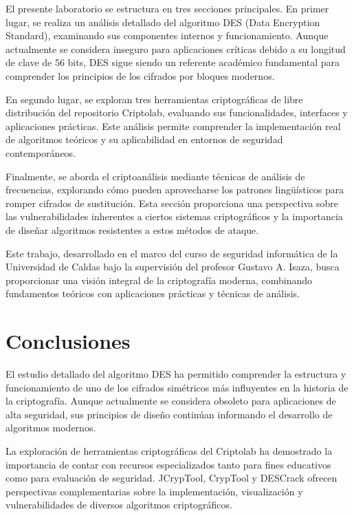 \documentclass[12pt,a4paper]{article}
\begin{document}
El presente laboratorio se estructura en tres secciones principales. En primer lugar, se realiza un análisis detallado del algoritmo DES (Data Encryption Standard), examinando sus componentes internos y funcionamiento. Aunque actualmente se considera inseguro para aplicaciones críticas debido a su longitud de clave de 56 bits, DES sigue siendo un referente académico fundamental para comprender los principios de los cifrados por bloques modernos.

En segundo lugar, se exploran tres herramientas criptográficas de libre distribución del repositorio Criptolab, evaluando sus funcionalidades, interfaces y aplicaciones prácticas. Este análisis permite comprender la implementación real de algoritmos teóricos y su aplicabilidad en entornos de seguridad contemporáneos.

Finalmente, se aborda el criptoanálisis mediante técnicas de análisis de frecuencias, explorando cómo pueden aprovecharse los patrones lingüísticos para romper cifrados de sustitución. Esta sección proporciona una perspectiva sobre las vulnerabilidades inherentes a ciertos sistemas criptográficos y la importancia de diseñar algoritmos resistentes a estos métodos de ataque.

Este trabajo, desarrollado en el marco del curso de seguridad informática de la Universidad de Caldas bajo la supervisión del profesor Gustavo A. Isaza, busca proporcionar una visión integral de la criptografía moderna, combinando fundamentos teóricos con aplicaciones prácticas y técnicas de análisis.














\section{Conclusiones}

El estudio detallado del algoritmo DES ha permitido comprender la estructura y funcionamiento de uno de los cifrados simétricos más influyentes en la historia de la criptografía. Aunque actualmente se considera obsoleto para aplicaciones de alta seguridad, sus principios de diseño continúan informando el desarrollo de algoritmos modernos.

La exploración de herramientas criptográficas del Criptolab ha demostrado la importancia de contar con recursos especializados tanto para fines educativos como para evaluación de seguridad. JCrypTool, CrypTool y DESCrack ofrecen perspectivas complementarias sobre la implementación, visualización y vulnerabilidades de diversos algoritmos criptográficos.
\end{document}
